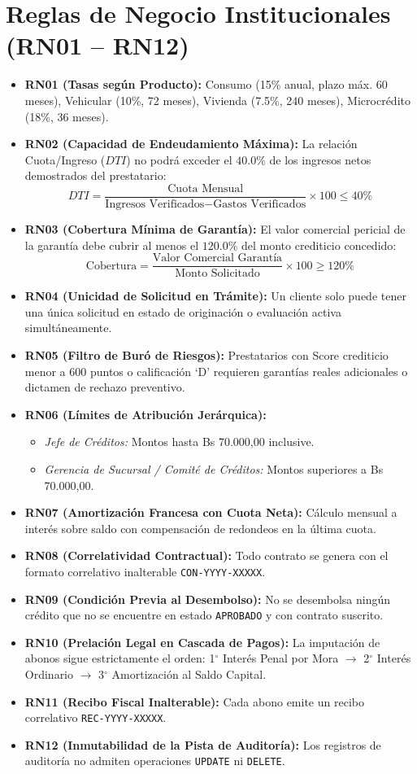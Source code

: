 \documentclass[11pt,letterpaper]{report}
\begin{document}
\section{Reglas de Negocio Institucionales (RN01 -- RN12)}
\begin{itemize}
    \item \textbf{RN01 (Tasas según Producto):} Consumo (15\% anual, plazo máx. 60 meses), Vehicular (10\%, 72 meses), Vivienda (7.5\%, 240 meses), Microcrédito (18\%, 36 meses).
    \item \textbf{RN02 (Capacidad de Endeudamiento Máxima):} La relación Cuota/Ingreso ($DTI$) no podrá exceder el $40.0\%$ de los ingresos netos demostrados del prestatario:
    \[ DTI = \frac{\text{Cuota Mensual}}{\text{Ingresos Verificados} - \text{Gastos Verificados}} \times 100 \le 40\% \]
    \item \textbf{RN03 (Cobertura Mínima de Garantía):} El valor comercial pericial de la garantía debe cubrir al menos el $120.0\%$ del monto crediticio concedido:
    \[ \text{Cobertura} = \frac{\text{Valor Comercial Garantía}}{\text{Monto Solicitado}} \times 100 \ge 120\% \]
    \item \textbf{RN04 (Unicidad de Solicitud en Trámite):} Un cliente solo puede tener una única solicitud en estado de originación o evaluación activa simultáneamente.
    \item \textbf{RN05 (Filtro de Buró de Riesgos):} Prestatarios con Score crediticio menor a 600 puntos o calificación `D' requieren garantías reales adicionales o dictamen de rechazo preventivo.
    \item \textbf{RN06 (Límites de Atribución Jerárquica):}
    \begin{itemize}
        \item \textit{Jefe de Créditos:} Montos hasta Bs 70.000,00 inclusive.
        \item \textit{Gerencia de Sucursal / Comité de Créditos:} Montos superiores a Bs 70.000,00.
    \end{itemize}
    \item \textbf{RN07 (Amortización Francesa con Cuota Neta):} Cálculo mensual a interés sobre saldo con compensación de redondeos en la última cuota.
    \item \textbf{RN08 (Correlatividad Contractual):} Todo contrato se genera con el formato correlativo inalterable \texttt{CON-YYYY-XXXXX}.
    \item \textbf{RN09 (Condición Previa al Desembolso):} No se desembolsa ningún crédito que no se encuentre en estado \texttt{APROBADO} y con contrato suscrito.
    \item \textbf{RN10 (Prelación Legal en Cascada de Pagos):} La imputación de abonos sigue estrictamente el orden: 1$^\circ$ Interés Penal por Mora $\rightarrow$ 2$^\circ$ Interés Ordinario $\rightarrow$ 3$^\circ$ Amortización al Saldo Capital.
    \item \textbf{RN11 (Recibo Fiscal Inalterable):} Cada abono emite un recibo correlativo \texttt{REC-YYYY-XXXXX}.
    \item \textbf{RN12 (Inmutabilidad de la Pista de Auditoría):} Los registros de auditoría no admiten operaciones \texttt{UPDATE} ni \texttt{DELETE}.
\end{itemize}
\end{document}
